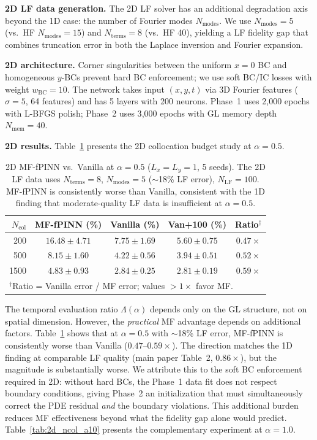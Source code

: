 \documentclass[11pt]{article}
\newcommand{\Ncol}{N_{\mathrm{col}}}
\newcommand{\NLF}{N_{\mathrm{LF}}}
\begin{document}
\textbf{2D LF data generation.} The 2D LF solver has an additional degradation axis beyond the 1D case: the number of Fourier modes $N_{\mathrm{modes}}$. We use $N_{\mathrm{modes}} = 5$ (vs.\ HF $N_{\mathrm{modes}} = 15$) and $N_{\mathrm{terms}} = 8$ (vs.\ HF 40), yielding a LF fidelity gap that combines truncation error in both the Laplace inversion and Fourier expansion.

\textbf{2D architecture.} Corner singularities between the uniform $x = 0$ BC and homogeneous $y$-BCs prevent hard BC enforcement; we use soft BC/IC losses with weight $w_{\mathrm{BC}} = 10$. The network takes input $(x, y, t)$ via 3D Fourier features ($\sigma = 5$, 64 features) and has 5 layers with 200 neurons. Phase~1 uses 2{,}000 epochs with L-BFGS polish; Phase~2 uses 3{,}000 epochs with GL memory depth $N_{\mathrm{mem}} = 40$.

\textbf{2D results.} Table~\ref{tab:2d_ncol} presents the 2D collocation budget study at $\alpha = 0.5$.

\begin{table}[t]
\centering
\caption{2D MF-fPINN vs.\ Vanilla at $\alpha = 0.5$ ($L_x = L_y = 1$, 5 seeds). The 2D LF data uses $N_{\mathrm{terms}} = 8$, $N_{\mathrm{modes}} = 5$ ($\sim$18\% LF error), $\NLF = 100$. MF-fPINN is consistently worse than Vanilla, consistent with the 1D finding that moderate-quality LF data is insufficient at $\alpha = 0.5$.}
\label{tab:2d_ncol}
\begin{tabular}{rcccc}
\toprule
$\Ncol$ & MF-fPINN (\%) & Vanilla (\%) & Van+100 (\%) & Ratio$^\dagger$ \\
\midrule
200 & $16.48 \pm 4.71$ & $7.75 \pm 1.69$ & $5.60 \pm 0.75$ & $0.47\times$ \\
500 & $8.15 \pm 1.60$ & $4.22 \pm 0.56$ & $3.94 \pm 0.51$ & $0.52\times$ \\
1500 & $4.83 \pm 0.93$ & $2.84 \pm 0.25$ & $2.81 \pm 0.19$ & $0.59\times$ \\
\bottomrule
\multicolumn{5}{l}{\small $^\dagger$Ratio = Vanilla error / MF error; values $>1\times$ favor MF.} \\
\end{tabular}
\end{table}

The temporal evaluation ratio $\Lambda(\alpha)$ depends only on the GL structure, not on spatial dimension. However, the \emph{practical} MF advantage depends on additional factors. Table~\ref{tab:2d_ncol} shows that at $\alpha = 0.5$ with $\sim$18\% LF error, MF-fPINN is consistently worse than Vanilla ($0.47$--$0.59\times$). The direction matches the 1D finding at comparable LF quality (main paper Table~2, $0.86\times$), but the magnitude is substantially worse. We attribute this to the soft BC enforcement required in 2D: without hard BCs, the Phase~1 data fit does not respect boundary conditions, giving Phase~2 an initialization that must simultaneously correct the PDE residual \emph{and} the boundary violations. This additional burden reduces MF effectiveness beyond what the fidelity gap alone would predict. Table~\ref{tab:2d_ncol_a10} presents the complementary experiment at $\alpha = 1.0$.
\end{document}
